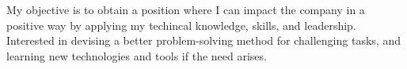 

\begin{cvparagraph}

My objective is to obtain a position where I can impact the company in a positive way by applying my techincal knowledge, skills, and leadership. Interested in devising a better problem-solving method for challenging tasks, and learning new technologies and tools if the need arises.
\end{cvparagraph}
